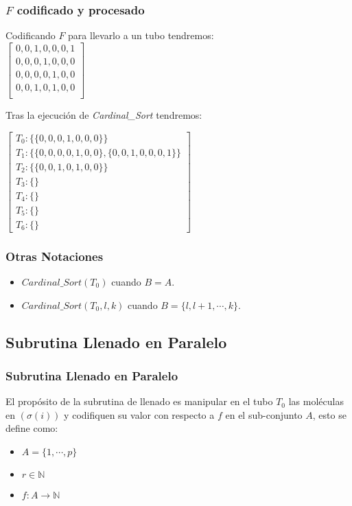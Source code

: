 \documentclass[12pt]{beamer}
\begin{document}
 \begin{frame}
     \frametitle{$F$ codificado y procesado}
     Codificando $F$ para llevarlo a un tubo tendremos: \\
    $
        \begin{bmatrix}
            0, 0, 1, 0, 0, 0, 1 \\
            0, 0, 0, 1, 0, 0, 0 \\
            0, 0, 0, 0, 1, 0, 0 \\
            0, 0, 1, 0, 1, 0, 0 \\
        \end{bmatrix}
    $
    \par Tras la ejecución de \emph{Cardinal\_Sort} tendremos: \\
    \begin{flushleft}
    $
    \left[
        \begin{array}{l}
            T_0: \{\{0, 0, 0, 1, 0, 0, 0\}\} \\
            T_1: \{\{0, 0, 0, 0, 1, 0, 0\}, \{0, 0, 1, 0, 0, 0, 1\}\} \\
            T_2: \{\{0, 0, 1, 0, 1, 0, 0\}\} \\
            T_3: \{\} \\
            T_4: \{\} \\
            T_5: \{\} \\
            T_6: \{\} 
        \end{array}
    \right]
    $
    \end{flushleft}
 \end{frame}
 \begin{frame}
     \frametitle{Otras Notaciones}
     \begin{itemize}
        \item $Cardinal\_Sort(T_0)$ cuando $B=A$.
        \item $Cardinal\_Sort(T_0, l, k)$ cuando $B=\{l, l+1,\cdots,k\}$.
    \end{itemize}
 \end{frame}
 \begin{frame}
     \subsection{Subrutina Llenado en Paralelo}
     \frametitle{Subrutina Llenado en Paralelo}
     El propósito de la subrutina de llenado es manipular en el tubo $T_0$ las moléculas en $(\sigma(i))$ y codifiquen su valor con respecto a $f$ en el sub-conjunto $A$, esto se define como:
   \begin{itemize}
       \item $A=\{1,\cdots,p\}$
       \item $r \in \mathbb{N}$
       \item $f:A\rightarrow\mathbb{N}$
   \end{itemize} 
 \end{frame}
\end{document}

